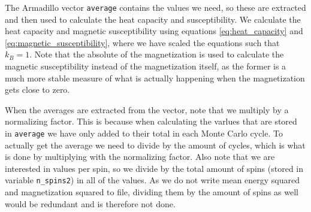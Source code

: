\documentclass[reprint,english,notitlepage]{revtex4-1}  %
\begin{document}
The Armadillo \citep{Armadillo} vector \verb+average+ contains the values we need, so these are extracted and then used to calculate the heat capacity and susceptibility. We calculate the heat capacity and magnetic susceptibility using equations \eqref{eq:heat_capacity} and \eqref{eq:magnetic_susceptibility}, where we have scaled the equations such that $k_B = 1$. Note that the absolute of the magnetization is used to calculate the magnetic susceptibility instead of the magnetization itself, as the former is a much more stable measure of what is actually happening when the magnetization gets close to zero.

When the averages are extracted from the vector, note that we multiply by a normalizing factor. This is because when calculating the varlues that are stored in \verb+average+ we have only added to their total in each Monte Carlo cycle. To actually get the average we need to divide by the amount of cycles, which is what is done by multiplying with the normalizing factor. Also note that we are interested in values per spin, so we divide by the total amount of spins (stored in variable \verb+n_spins2+) in all of the values. As we do not write mean energy squared and magnetization squared to file, dividing them by the amount of spins as well would be redundant and is therefore not done.
\end{document}
